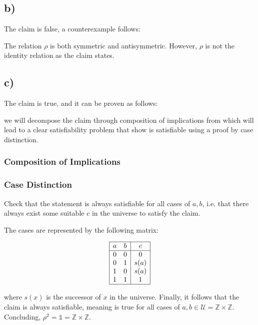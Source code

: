 \documentclass[unicode,11pt,a4paper,oneside,numbers=endperiod,openany]{scrartcl}
\newcommand{\myex}[3]{
    \ifthenelse{\equal{#1}{true}}{
        \begin{equation} \label{#2} \begin{aligned} #3 \end{aligned} \end{equation}
    }{
        \begin{equation*} \label{#2} \begin{aligned} #3 \end{aligned} \end{equation*}
    }
}
\begin{document}
\subsection*{b)}

The claim is false, a counterexample follows:

\myex{false}{ex5-5-b-counterexample}{
    \rho = \emptyset \neq \textsf{id}_A
}

The relation \( \rho \) is both symmetric and antisymmetric.
However, \( \rho \) is not the identity relation as the claim states.

\subsection*{c)}

The claim is true, and it can be proven as follows:

we will decompose the claim through composition of implications from which will lead
to a clear satisfiability problem that show is satisfiable using a proof by case distinction.

\subsubsection*{Composition of Implications}

\subsubsection*{Case Distinction}

Check that the statement is always satisfiable for all cases of \( a, b \),
i.e. that there always exist some suitable \( c \) in the universe to satisfy the claim.

The cases are represented by the following matrix:

\[
    \begin{array}{|cc|c|}
        \hline
        a & b & c \\
        \hline
        0 & 0 & 0    \\
        0 & 1 & s(a) \\
        1 & 0 & s(a) \\
        1 & 1 & 1    \\
        \hline
    \end{array}
\]

where \( s(x) \) is the successor of \( x \) in the universe.
Finally, it follows that the claim is always satisfiable, 
meaning is true for all cases of \( a, b \in \mathcal{U} = \mathbb{Z} \times \mathbb{Z} \).
Concluding, \( \rho^2 = \mathds{1} = \mathbb{Z} \times \mathbb{Z} \).
\end{document}
